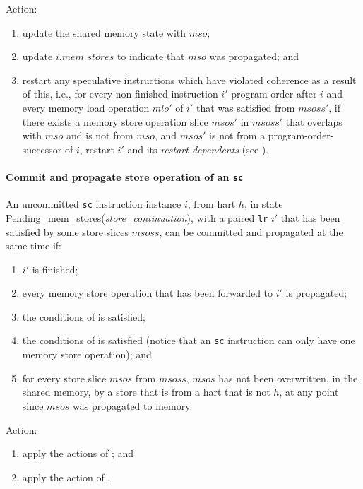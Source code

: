 Action:
\begin{enumerate}
\item update the shared memory state with $mso$;
\item update $i.\textit{mem\_stores}$ to indicate that $mso$ was propagated; and
\item restart any speculative instructions which have violated coherence as a result of this, i.e., for every non-finished instruction $i'$ program-order-after $i$ and every memory load operation $mlo'$ of $i'$ that was satisfied from $msoss'$, if there exists a memory store operation slice $msos'$ in $msoss'$ that overlaps with $mso$ and is not from $mso$, and $msos'$ is not from a program-order-successor of $i$, restart $i'$ and its {\em restart-dependents} (see ).
\end{enumerate}


\paragraph{Commit and propagate store operation of an {\tt sc}}\label{omm:commit_sc}
An uncommitted {\tt sc} instruction instance $i$, from hart $h$, in state {\sc Pending\_mem\_stores}({\it store\_continuation}), with a paired {\tt lr} $i'$ that has been satisfied by some store slices $msoss$, can be committed and propagated at the same time if:
\begin{enumerate}
\item $i'$ is finished;
\item every memory store operation that has been forwarded to $i'$ is propagated;
\item the conditions of  is satisfied;
\item the conditions of  is satisfied (notice that an {\tt sc} instruction can only have one memory store operation); and
\item for every store slice $msos$ from $msoss$, $msos$ has not been overwritten, in the shared memory, by a store that is from a hart that is not $h$, at any point since $msos$ was propagated to memory.
\end{enumerate}
Action:
\begin{enumerate}
\item apply the actions of ; and
\item apply the action of .
\end{enumerate}


